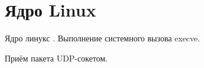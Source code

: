 \section{Ядро Linux}

Ядро линукс \cite{gonchar}. Выполнение системного вызова execve.

Приём пакета UDP-сокетом.

\clearpage
